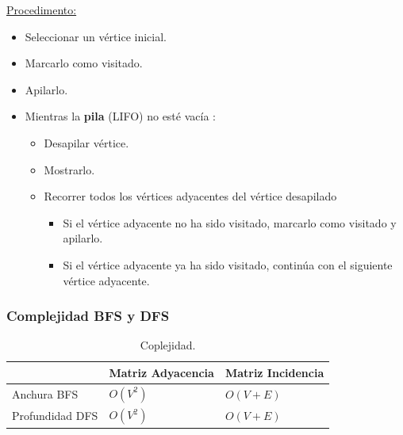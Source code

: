 \documentclass[../main.tex]{subfiles}
\begin{document}
                \underline{Procedimento:}
                \begin{itemize}
                    \item Seleccionar un vértice inicial.
                    \item Marcarlo como visitado.
                    \item Apilarlo.
                    \item Mientras la \textbf{pila} (LIFO) no esté vacía :
                        \begin{itemize}
                            \item Desapilar vértice.
                            \item Mostrarlo.
                            \item Recorrer todos los vértices adyacentes del vértice desapilado
                                \begin{itemize}
                                    \item Si el vértice adyacente no ha sido visitado, marcarlo como visitado y apilarlo.
                                    \item Si el vértice adyacente ya ha sido visitado, continúa con el siguiente vértice adyacente.
                                \end{itemize}
                        \end{itemize}
                \end{itemize}

            \subsubsection{Complejidad BFS y DFS}
                
                \begin{table}[ht]
                    \centering
                    \begin{tabular}{|l|l|l|}
                    \hline
                    & Matriz Adyacencia & Matriz Incidencia  \\ \hline
                    Anchura BFS & $O(V^2)$ & $O(V+E)$ \\ \hline
                    Profundidad DFS & $O(V^2)$ & $O(V+E)$  \\ \hline
                    \end{tabular}
                    \caption[short]{Coplejidad.}
                \end{table}
\end{document}
